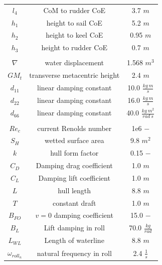 \documentclass[conference]{IEEEtran}
\begin{document}
\begin{table}[ht]
\begin{tabular}{c|c|c}
    $l_4$       & CoM to rudder CoE     & 3.7 $m$       \\[4pt]
    $h_1$       & height to sail CoE    & 5.2 $m$       \\[4pt]
    $h_2$       & height to keel CoE    & 0.95 $m$      \\[4pt]
    $h_3$       & height to rudder CoE  & 0.7 $m$       \\[4pt]
\hline & \\[-6pt]
    $\nabla$    & water displacement            & 1.568 $m^3$                   \\[4pt]
    $GM_t$      & transverse metacentric height & 2.4 $m$                       \\[4pt]
    $d_{11}$    & linear damping constant       & 10.0 $\frac{kg\ m}{s}$        \\[4pt]
    $d_{22}$    & linear damping constant       & 16.0 $\frac{kg\ m}{s}$        \\[4pt]
    $d_{66}$    & linear damping constant       & 40.0 $\frac{kg\ m^2}{rad\ s}$ \\[4pt]
\hline & \\[-6pt]
    $Re_c$              & current Renolds number    & 1e6  $-$              \\[4pt]
    $S_H$               & wetted surface area       & 9.8 $m^2$             \\[4pt]
    $k$                 & hull form factor          & 0.15 $-$              \\[4pt]
    $C_D$               & Damping drag coefficient  & 1.0 $m$               \\[4pt]
    $C_L$               & Damping lift coefficient  & 1.0 $m$               \\[4pt]
    $L$                 & hull length               & 8.8 $m$               \\[4pt]
    $T$                 & constant draft            & 1.0 $m$               \\[4pt]
    $B_{FO}$            & $v=0$ damping coefficient & 15.0 $-$              \\[4pt]
    $B_L$               & Lift damping in roll      & 70.0 $\frac{kg}{rad}$ \\[4pt]
    $L_{WL}$            & Length of waterline       & 8.8 $m$               \\[4pt]
    $\omega_{roll_n}$   & natural frequency in roll & 2.4 $\frac{1}{s}$     \\[4pt]
\hline
\end{tabular}
\label{tab:dynamics_parameters}
\end{table}
\end{document}
